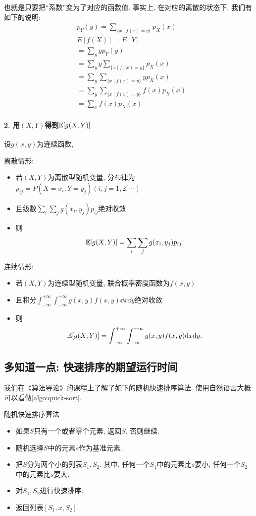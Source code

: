     也就是只要把``系数''变为了对应的函数值. 事实上, 在对应的离散的状态下, 我们有如下的说明: 
    \begin{align*} & p_Y(y)=\sum_{\{x \mid f(x)=y\}} p_X(x) \\ & E[f(X)]=E[Y] \\ & =\sum_y y p_Y(y) \\ & =\sum_y y \sum_{\{x \mid f(x)=y\}} p_X(x) \\ & =\sum_y \sum_{\{x \mid f(x)=y\}} y p_X(x) \\ & =\sum_y \sum_{\{x \mid f(x)=y\}} f(x) p_X(x) \\ & =\sum_x f(x) p_X(x)\end{align*}

    \paragraph{2. 用$(X,Y)$得到$\mathbb E[g(X,Y)]$}设$g(x,y)$为连续函数, 

    离散情形: 
    \begin{itemize}
        \item 若$(X,Y)$为离散型随机变量, 分布律为$p_{ij} = P(X=x_i,Y=y_j)(i,j=1,2,\cdots)$
        \item 且级数$\sum_i \sum_j g(x_i,y_j)p_{ij}$绝对收敛
        \item 则$$\mathbb E[g(X,Y)]=\sum_i \sum_j g(x_i,y_j)p_{ij}.$$
    \end{itemize}    

    连续情形:\begin{itemize}
        \item 若$(X,Y)$为连续型随机变量, 联合概率密度函数为$f(x,y)$
        \item 且积分$\int_{-\infty}^{+\infty}\int_{-\infty}^{+\infty}g(x,y)f(x,y)\dd x\dd y$绝对收敛
        \item 则$$\mathbb E[g(X,Y)]=\int_{-\infty}^{+\infty}\int_{-\infty}^{+\infty}g(x,y)f(x,y)\mathrm{d} x\mathrm{d} y.$$
    \end{itemize}  

\subsection*{多知道一点: 快速排序的期望运行时间}

我们在《算法导论》的课程上了解了如下的随机快速排序算法. 使用自然语言大概可以看做\cref{algo:quick-sort}. 
\begin{algorithm}
    \caption{随机快速排序算法}
    \label{algo:quick-sort}
    \begin{itemize}
        \item 如果$S$只有一个或者零个元素, 返回$S$. 否则继续. 
        \item 随机选择$S$中的元素$s$作为基准元素. 
        \item 把$S$分为两个小的列表$S_1, S_2$. 其中, 任何一个$S_1$中的元素比$s$要小, 任何一个$S_2$中的元素比$s$要大.
        \item 对$S_1, S_2$进行快速排序. 
        \item 返回列表$[S_1, x, S_2]$.
    \end{itemize}
\end{algorithm}

